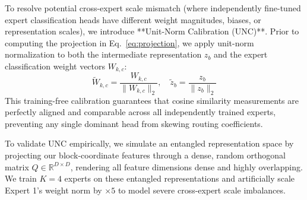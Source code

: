 To resolve potential cross-expert scale mismatch (where independently fine-tuned expert classification heads have different weight magnitudes, biases, or representation scales), we introduce **Unit-Norm Calibration (UNC)**. Prior to computing the projection in Eq.~\ref{eq:projection}, we apply unit-norm normalization to both the intermediate representation $z_b$ and the expert classification weight vectors $W_{k,c}$:
\begin{equation}
\tilde{W}_{k,c} = \frac{W_{k,c}}{\|W_{k,c}\|_2}, \quad \tilde{z}_b = \frac{z_b}{\|z_b\|_2}
\label{eq:unc}
\end{equation}
This training-free calibration guarantees that cosine similarity measurements are perfectly aligned and comparable across all independently trained experts, preventing any single dominant head from skewing routing coefficients.

To validate UNC empirically, we simulate an entangled representation space by projecting our block-coordinate features through a dense, random orthogonal matrix $Q \in \mathbb{R}^{D \times D}$, rendering all feature dimensions dense and highly overlapping. We train $K=4$ experts on these entangled representations and artificially scale Expert 1's weight norm by $\times 5$ to model severe cross-expert scale imbalances.

\begin{table}[h]
\caption{Ablation of Unit-Norm Calibration (UNC) under synthetic cross-expert scale imbalances (Expert 1 norm scaled by $\times 5$). Without UNC, uncalibrated cosine routing collapses completely as the dominant expert skews all coefficients. UNC fully restores robust routing alignment.}
\label{tab:unc_ablation}
\vskip 0.1in
\begin{center}
\begin{small}
\end{small}
\end{center}
\vskip -0.1in
\end{table}


